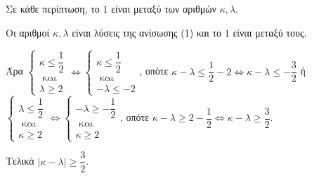 \begin{alist}
\begin{rlist}
Σε κάθε περίπτωση, το $1$ είναι μεταξύ των αριθμών $\kappa, \lambda$.

\item Οι αριθμοί $\kappa, \lambda$ είναι λύσεις της ανίσωσης (1) και το $1$ είναι μεταξύ τους.

Άρα
$\begin{cases} \kappa \le \dfrac{1}{2} \\ \text{ και} \\ \lambda \ge 2 \end{cases} \Leftrightarrow \begin{cases} \kappa \le \dfrac{1}{2} \\ \text{ και} \\ -\lambda \le -2 \end{cases}$, οπότε $\kappa - \lambda \le \dfrac{1}{2} - 2 \Leftrightarrow \kappa - \lambda \le -\dfrac{3}{2}$ 
ή 
$\begin{cases} \lambda \le \dfrac{1}{2} \\ \text{ και} \\ \kappa \ge 2 \end{cases} \Leftrightarrow \begin{cases} -\lambda \ge -\dfrac{1}{2} \\ \text{ και} \\ \kappa \ge 2 \end{cases}$, οπότε $\kappa - \lambda \ge 2 - \dfrac{1}{2} \Leftrightarrow \kappa - \lambda \ge \dfrac{3}{2}$.

Τελικά $|\kappa - \lambda| \ge \dfrac{3}{2}$.
\end{rlist}
\end{alist}

